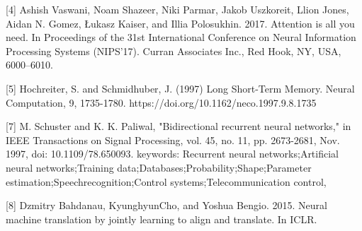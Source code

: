 \documentclass{article}
\begin{document}
[4] Ashish Vaswani, Noam Shazeer, Niki Parmar, Jakob Uszkoreit, Llion Jones, Aidan N. Gomez, Łukasz Kaiser, and Illia Polosukhin. 2017. Attention is all you need. In Proceedings of the 31st International Conference on Neural Information Processing Systems (NIPS’17). Curran Associates Inc., Red Hook, NY, USA, 6000–6010.

[5] Hochreiter, S. and Schmidhuber, J. (1997) Long Short-Term Memory. Neural Computation, 9, 1735-1780. https://doi.org/10.1162/neco.1997.9.8.1735

[7] M. Schuster and K. K. Paliwal, "Bidirectional recurrent neural networks," in IEEE Transactions on Signal Processing, vol. 45, no. 11, pp. 2673-2681, Nov. 1997, doi: 10.1109/78.650093. keywords: Recurrent neural networks;Artificial neural networks;Training data;Databases;Probability;Shape;Parameter estimation;Speechrecognition;Control systems;Telecommunication control,

[8] Dzmitry Bahdanau, KyunghyunCho, and Yoshua Bengio. 2015. Neural machine translation by jointly
learning to align and translate. In ICLR.
\end{document}
